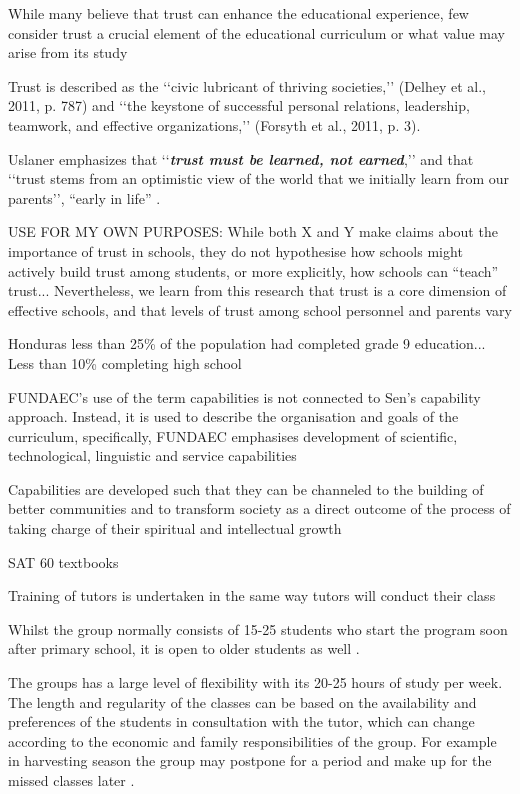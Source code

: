 While many believe that trust can enhance the educational experience, few consider trust a crucial element of the educational curriculum or what value may arise from its study \citep{Murphy-Graham2014}

Trust is described as the ‘‘civic lubricant of thriving societies,’’ (Delhey et al., 2011, p. 787) and ‘‘the keystone of successful personal relations, leadership, teamwork, and effective organizations,’’ (Forsyth et al., 2011, p. 3). \citep{Murphy-Graham2014}

Uslaner emphasizes that ‘‘\textit{\textbf{trust must be learned, not earned}},’’ and that ‘‘trust stems from an optimistic view of the world that we initially learn from our parents’’, “early in life” \citep[][p76-7, emphasis in original]{Uslaner2002a}.

USE FOR MY OWN PURPOSES: While both X and Y make claims about the importance of trust in schools, they do not hypothesise how schools might actively build trust among students, or more explicitly, how schools can “teach” trust... Nevertheless, we learn from this research that trust is a core dimension of effective schools, and that levels of trust among school personnel and parents vary \citep{Murphy-Graham2014}

Honduras less than 25\% of the population had completed grade 9 education... Less than 10\% completing high school \citep{Murphy-Graham2014}

FUNDAEC's use of the term capabilities is not connected to Sen's capability approach. Instead, it is used to describe the organisation and goals of the curriculum, specifically, FUNDAEC emphasises development of scientific, technological, linguistic and service capabilities \citep{Murphy-Graham2014}

Capabilities are developed such that they can be channeled to the building of better communities and to transform society as a direct outcome of the process of taking charge of their spiritual and intellectual growth \citep{Murphy-Graham2014}

SAT 60 textbooks \citep{Murphy-Graham2014}

Training of tutors is undertaken in the same way tutors will conduct their class \citep{Murphy-Graham2014}

Whilst the group normally consists of 15-25 students who start the program soon after primary school, it is open to older students as well \citep{Murphy-Graham2014}.

The groups has a large level of flexibility with its 20-25 hours of study per week. The length and regularity of the classes can be  based on the availability and preferences of the students in consultation with the tutor, which can change according to the economic and family responsibilities of the group. For example in harvesting season the group may postpone for a period and make up for the missed classes later \citep{Murphy-Graham2014}.

